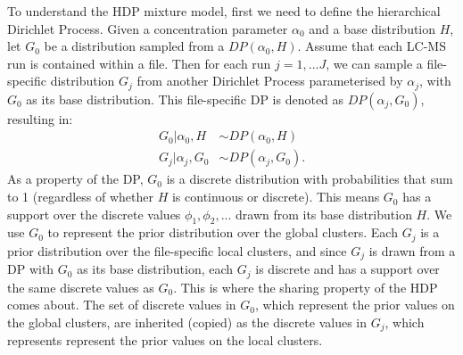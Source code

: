 To understand the HDP mixture model, first we need to define the hierarchical Dirichlet Process. Given a concentration parameter $\alpha_0$ and a base distribution $H$, let $G_0$ be a distribution sampled from a $DP(\alpha_0, H)$. Assume that each LC-MS run is contained within a file. Then for each run $j=1,...J$, we can sample a file-specific distribution $G_j$ from another Dirichlet Process parameterised by $\alpha_j$, with $G_0$ as its base distribution. This file-specific DP is denoted as $DP(\alpha_j, G_0)$, resulting in:
\begin{equation}
\begin{aligned}
G_0 \vert \alpha_0, H &\sim DP(\alpha_0, H) \\
G_j \vert \alpha_j, G_0 &\sim DP(\alpha_j, G_0).
\end{aligned}
\label{eq:background-hdp-process}
\end{equation}
As a property of the DP, $G_0$ is a discrete distribution with probabilities that sum to 1 (regardless of whether $H$ is continuous or discrete). This means $G_0$ has a support over the discrete values ${\phi_1, \phi_2, ... }$ drawn from its base distribution $H$. We use $G_0$ to represent the prior distribution over the global clusters. Each $G_j$ is a prior distribution over the file-specific local clusters, and since $G_j$ is drawn from a DP with $G_0$ as its base distribution, each $G_j$ is discrete and has a support over the same discrete values as $G_0$. This is where the sharing property of the HDP comes about. The set of discrete values in $G_0$, which represent the prior values on the global clusters, are inherited (copied) as the discrete values in $G_j$, which represents represent the prior values on the local clusters.

